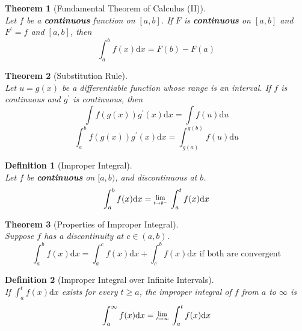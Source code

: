 \documentclass[12pt]{article}
\newcommand{\diff}{\mathrm{d}}
\newcommand{\Lim}[1]{\raisebox{0.5ex}{\scalebox{0.8}{$\displaystyle \lim_{#1}\;$}}}
\newtheorem{definition}{Definition}[section]
\newtheorem{theorem}{Theorem}[section]
\theoremstyle{definition}
\begin{document}
\begin{theorem}[Fundamental Theorem of Calculus (II)]
\hfill\\
\normalfont Let $f$ be a \textbf{continuous} function on $[a,b]$. If $F$ is \textbf{continuous} on $[a,b]$ and $F^\prime = f$ and $[a,b]$, then
\[
\int_{a}^{b} f(x)\diff x = F(b)-F(a)
\]
\end{theorem}
\begin{theorem}[Substitution Rule]
\hfill\\
\normalfont Let $u=g(x)$ be a differentiable function whose range is an interval. If $f$ is continuous and $g^\prime$ is continuous, then
\[
\int f(g(x))g^\prime (x)\diff x=\int f(u)\diff u
\]
\[
\int^{b}_{a} f(g(x))g^\prime (x)\diff x=\int ^{g(b)}_{g(a)} f(u)\diff u
\]
\end{theorem}
\begin{definition}[Improper Integral]
\hfill\\
\normalfont Let $f$ be \textbf{continuous} on $[a,b)$, and discontinuous at $b$.
\[
\int_{a}^{b} f(x)\diff x  = \Lim{t\to b^-}\int_{a}^{t} f(x)\diff x 
\]
\end{definition}
\begin{theorem}[Properties of Improper Integral]
\hfill\\
\normalfont Suppose $f$ has a discontinuity at $c\in (a,b)$.
\[
\int_{a}^{b} f(x)\diff x =\int_{a}^{c} f(x)\diff x +\int_{c}^{b} f(x)\diff x\text{ if both are convergent} 
\] 
\end{theorem}
\begin{definition}[Improper Integral over Infinite Intervals]
\hfill\\
\normalfont If $\int_{a}^{t} f(x)\diff x$ exists for every $t\geq a$, the improper integral of $f$ from $a$ to $\infty$ is 
\[
\int_{a}^{\infty} f(x)\diff x=\Lim{t\to \infty}\int_{a}^{t} f(x)\diff x  
\] 
\end{definition}
\clearpage
\end{document}
